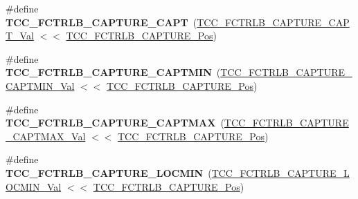 \begin{DoxyCompactItemize}
\item 
\hypertarget{group___s_a_m_l21___t_c_c_gaf3068569c87d4748b49e6bddc54a1d35}{}\#define {\bfseries T\+C\+C\+\_\+\+F\+C\+T\+R\+L\+B\+\_\+\+C\+A\+P\+T\+U\+R\+E\+\_\+\+C\+A\+P\+T}~(\hyperlink{group___s_a_m_l21___t_c_c_ga3f8b5d8c1c5d49b7e304dfa70344319c}{T\+C\+C\+\_\+\+F\+C\+T\+R\+L\+B\+\_\+\+C\+A\+P\+T\+U\+R\+E\+\_\+\+C\+A\+P\+T\+\_\+\+Val}   $<$$<$ \hyperlink{group___s_a_m_l21___t_c_c_gaf72ca0ec9e27e86144624bfb8d4ac36b}{T\+C\+C\+\_\+\+F\+C\+T\+R\+L\+B\+\_\+\+C\+A\+P\+T\+U\+R\+E\+\_\+\+Pos})\label{group___s_a_m_l21___t_c_c_gaf3068569c87d4748b49e6bddc54a1d35}

\item 
\hypertarget{group___s_a_m_l21___t_c_c_gac002a0739aae0ca24ffcb5910aecc65b}{}\#define {\bfseries T\+C\+C\+\_\+\+F\+C\+T\+R\+L\+B\+\_\+\+C\+A\+P\+T\+U\+R\+E\+\_\+\+C\+A\+P\+T\+M\+I\+N}~(\hyperlink{group___s_a_m_l21___t_c_c_gad537bb51ea6e26841a7646ac9cc34900}{T\+C\+C\+\_\+\+F\+C\+T\+R\+L\+B\+\_\+\+C\+A\+P\+T\+U\+R\+E\+\_\+\+C\+A\+P\+T\+M\+I\+N\+\_\+\+Val} $<$$<$ \hyperlink{group___s_a_m_l21___t_c_c_gaf72ca0ec9e27e86144624bfb8d4ac36b}{T\+C\+C\+\_\+\+F\+C\+T\+R\+L\+B\+\_\+\+C\+A\+P\+T\+U\+R\+E\+\_\+\+Pos})\label{group___s_a_m_l21___t_c_c_gac002a0739aae0ca24ffcb5910aecc65b}

\item 
\hypertarget{group___s_a_m_l21___t_c_c_ga16785eb521e5ea5ef5e55fc1d346a880}{}\#define {\bfseries T\+C\+C\+\_\+\+F\+C\+T\+R\+L\+B\+\_\+\+C\+A\+P\+T\+U\+R\+E\+\_\+\+C\+A\+P\+T\+M\+A\+X}~(\hyperlink{group___s_a_m_l21___t_c_c_ga49b047996949e583c9d276615c2b2cde}{T\+C\+C\+\_\+\+F\+C\+T\+R\+L\+B\+\_\+\+C\+A\+P\+T\+U\+R\+E\+\_\+\+C\+A\+P\+T\+M\+A\+X\+\_\+\+Val} $<$$<$ \hyperlink{group___s_a_m_l21___t_c_c_gaf72ca0ec9e27e86144624bfb8d4ac36b}{T\+C\+C\+\_\+\+F\+C\+T\+R\+L\+B\+\_\+\+C\+A\+P\+T\+U\+R\+E\+\_\+\+Pos})\label{group___s_a_m_l21___t_c_c_ga16785eb521e5ea5ef5e55fc1d346a880}

\item 
\hypertarget{group___s_a_m_l21___t_c_c_ga59d1b7d15e8946e1bb1b43f85f82cb50}{}\#define {\bfseries T\+C\+C\+\_\+\+F\+C\+T\+R\+L\+B\+\_\+\+C\+A\+P\+T\+U\+R\+E\+\_\+\+L\+O\+C\+M\+I\+N}~(\hyperlink{group___s_a_m_l21___t_c_c_ga6fc936694b3fb720f50c91ad57ffb6c3}{T\+C\+C\+\_\+\+F\+C\+T\+R\+L\+B\+\_\+\+C\+A\+P\+T\+U\+R\+E\+\_\+\+L\+O\+C\+M\+I\+N\+\_\+\+Val} $<$$<$ \hyperlink{group___s_a_m_l21___t_c_c_gaf72ca0ec9e27e86144624bfb8d4ac36b}{T\+C\+C\+\_\+\+F\+C\+T\+R\+L\+B\+\_\+\+C\+A\+P\+T\+U\+R\+E\+\_\+\+Pos})\label{group___s_a_m_l21___t_c_c_ga59d1b7d15e8946e1bb1b43f85f82cb50}


\end{DoxyCompactItemize}
